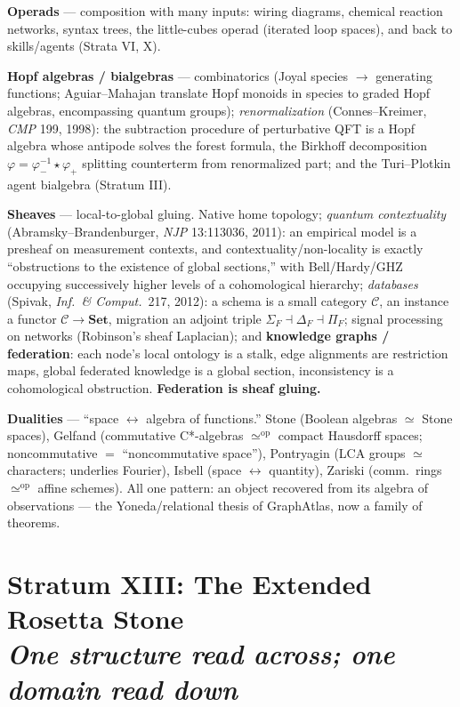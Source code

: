 \documentclass[11pt]{article}
\theoremstyle{plain}
\theoremstyle{definition}
\theoremstyle{remark}
\newcommand{\C}{\mathcal{C}}
\newcommand{\Set}{\mathbf{Set}}
\newcommand{\op}{\mathrm{op}}
\newcommand{\stratum}[2]{\section{#1\\ {\normalsize\normalfont\itshape #2}}}
\begin{document}
\textbf{Operads} --- composition with many inputs: wiring diagrams, chemical reaction networks, syntax trees, the little-cubes operad (iterated loop spaces), and back to skills/agents (Strata VI, X).

\textbf{Hopf algebras / bialgebras} --- combinatorics (Joyal species $\to$ generating functions; Aguiar--Mahajan translate Hopf monoids in species to graded Hopf algebras, encompassing quantum groups); \emph{renormalization} (Connes--Kreimer, \emph{CMP} 199, 1998): the subtraction procedure of perturbative QFT is a Hopf algebra whose antipode solves the forest formula, the Birkhoff decomposition $\varphi = \varphi_-^{-1}\star\varphi_+$ splitting counterterm from renormalized part; and the Turi--Plotkin agent bialgebra (Stratum III).

\textbf{Sheaves} --- local-to-global gluing. Native home topology; \emph{quantum contextuality} (Abramsky--Brandenburger, \emph{NJP} 13:113036, 2011): an empirical model is a presheaf on measurement contexts, and contextuality/non-locality is exactly ``obstructions to the existence of global sections,'' with Bell/Hardy/GHZ occupying successively higher levels of a cohomological hierarchy; \emph{databases} (Spivak, \emph{Inf.\ \& Comput.}\ 217, 2012): a schema is a small category $\C$, an instance a functor $\C\to\Set$, migration an adjoint triple $\Sigma_F \dashv \Delta_F \dashv \Pi_F$; signal processing on networks (Robinson's sheaf Laplacian); and \textbf{knowledge graphs / federation}: each node's local ontology is a stalk, edge alignments are restriction maps, global federated knowledge is a global section, inconsistency is a cohomological obstruction. \textbf{Federation is sheaf gluing.}

\textbf{Dualities} --- ``space $\leftrightarrow$ algebra of functions.'' Stone (Boolean algebras $\simeq$ Stone spaces), Gelfand (commutative C*-algebras $\simeq^{\op}$ compact Hausdorff spaces; noncommutative $=$ ``noncommutative space''), Pontryagin (LCA groups $\simeq$ characters; underlies Fourier), Isbell (space $\leftrightarrow$ quantity), Zariski (comm.\ rings $\simeq^{\op}$ affine schemes). All one pattern: an object recovered from its algebra of observations --- the Yoneda/relational thesis of GraphAtlas, now a family of theorems.

\stratum{Stratum XIII: The Extended Rosetta Stone}{One structure read across; one domain read down}
\end{document}
